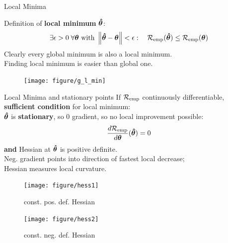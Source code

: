 \documentclass[11pt,compress,t,notes=noshow, xcolor=table]{beamer}
\begin{document}

\begin{vbframe}{Local Minima}
  
  Definition of \textbf{local minimum} $\bm{\hat\theta}$:
\[
  \exists \epsilon > 0\; \forall \bm{\theta} \text{ with } \left\Vert\bm{\hat\theta} - \bm{\theta}\right\Vert < \epsilon: \quad \mathcal{R}_{\text{emp}}(\bm{\hat\theta}) \leq \mathcal{R}_{\text{emp}}(\bm{\theta}) 
\]
  Clearly every global minimum is also a local minimum.\\
  
  Finding local minimum is easier than global one.
  
  \vfill
  
  \begin{figure}[!b]
    \texttt{[image: figure/g\_l\_min]}
  \end{figure}
  
\end{vbframe}


\begin{vbframe}{Local Minima and stationary points}
  \footnotesize
  If $\mathcal{R}_{\text{emp}}$ continuously differentiable, \textbf{sufficient condition} for local minimum: \\
$\bm{\hat\theta}$ is \textbf{stationary}, so 0 gradient, so no local improvement possible:
\[
  \frac{d \mathcal{R}_{\text{emp}}}{d\bm{\theta}}(\bm{\hat\theta}) = 0
\]
  \textbf{and} Hessian at $\bm{\hat\theta}$ is positive definite. \\
  
  Neg. gradient points into direction of fastest local decrease;\\
  Hessian measures local curvature.
  
  \begin{figure}[!htb]
    {
    \texttt{[image: figure/hess1]}
    \caption*{\footnotesize const. pos. def. Hessian}
    }
    {
    \texttt{[image: figure/hess2]}
    \caption*{\footnotesize const. neg. def. Hessian}
    }
  \end{figure}
  
\end{vbframe}

\end{document}
